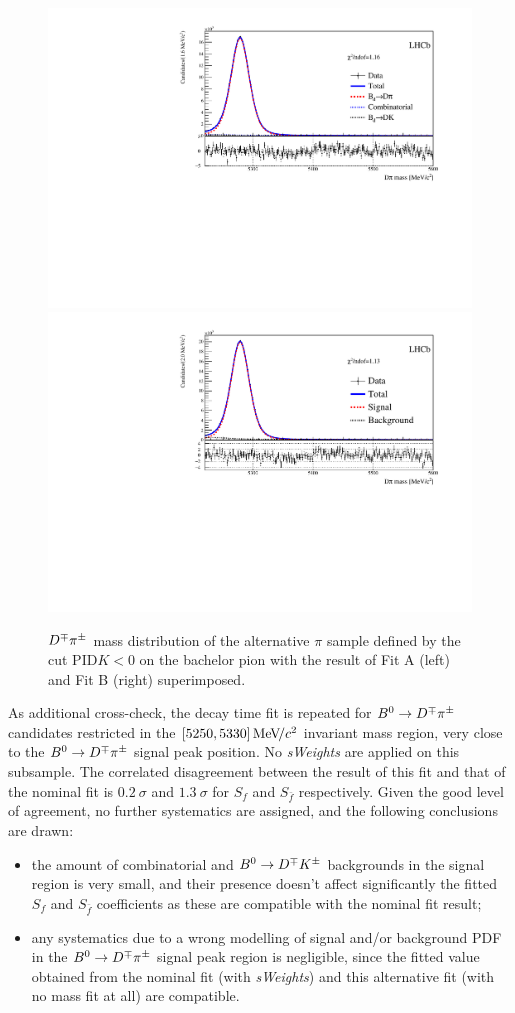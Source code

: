 \begin{figure}[htbp]
        \begin{center}
                \includegraphics[width=0.49\linewidth]{06Systematics/figs/MDFitPlots_Bd_pidk0/MDFit_BeautyMass_Bd2DPi_withPulls.pdf}
                \includegraphics[width=0.49\linewidth]{06Systematics/figs/MDFitPlots_Bd_pidk0/MDFitForSWeights_BeautyMass_Bd2DPi.pdf}
                \end{center}
        \vspace{-2mm}
        \caption{$D^\mp\pi^\pm$ mass distribution of the alternative $\pi$ sample defined by the cut PID$K<0$ on the bachelor pion with the result of Fit A (left) and Fit B (right) superimposed.}
        \label{fig:MassFitPIDK0}
\end{figure}

As additional cross-check, the decay time fit is repeated for $B^0\rightarrow D^\mp\pi^\pm$ candidates restricted in the $[5250,5330]{\mathrm{\,Me\kern -0.1em V\!/}c^2}$ invariant mass region, very close to
the $B^0\rightarrow D^\mp\pi^\pm$ signal peak position. No \emph{sWeights} are applied on this subsample. 
The correlated disagreement between the result of this fit and that of the nominal fit is $0.2~\sigma$ and $1.3~\sigma$ for $S_f$ and $S_{\bar f}$ respectively. 
Given the good level of agreement, no further systematics are assigned, and the following conclusions are drawn:
\begin{itemize}[noitemsep,topsep=0pt]
  \item the amount of combinatorial and $B^0\rightarrow D^\mp K^\pm$ backgrounds in the signal region is very small,
    and their presence doesn't affect significantly the fitted $S_f$ and $S_{\bar f}$ coefficients as these are compatible with the nominal fit result;
  \item any systematics due to a wrong modelling of signal and/or background PDF in the $B^0\rightarrow D^\mp\pi^\pm$ signal peak region is negligible, since the fitted value obtained from the nominal fit (with \emph{sWeights})
    and this alternative fit (with no mass fit at all) are compatible.
\end{itemize}
